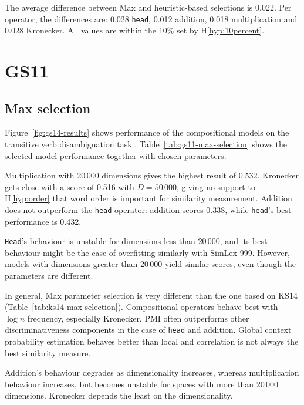 The average difference between Max and heuristic-based selections is 0.022. Per operator, the differences are: 0.028 \texttt{head}, 0.012 addition, 0.018 multiplication and 0.028 Kronecker. All values are within the 10\% set by H\ref{hyp:10percent}.

\section{GS11}
\label{sec:gs11}

\subsection{Max selection}
\label{sec:max-selection-gs11}



Figure~\ref{fig:gs14-results} shows performance of the compositional models on the transitive verb disambiguation task \cite{Grefenstette:2011:ESC:2145432.2145580}. Table~\ref{tab:gs11-max-selection} shows the selected model performance together with chosen parameters.

Multiplication with 20\,000 dimensions gives the highest result of 0.532. Kronecker gets close with a score of 0.516 with $D = 50\,000$, giving no support to H\ref{hyp:order} that word order is important for similarity measurement. Addition does not outperform the \texttt{head} operator: addition scores 0.338, while \texttt{head}'s best performance is 0.432.

\texttt{Head}'s behaviour is unstable for dimensions less than 20\,000, and its best behaviour might be the case of overfitting similarly with SimLex-999. However, models with dimensions greater than 20\,000 yield similar scores, even though the parameters are different.

In general, Max parameter selection is very different than the one based on KS14 (Table~\ref{tab:ks14-max-selection}). Compositional operators behave best with $\log n$ frequency, especially Kronecker. PMI often outperforms other discriminativeness components in the case of \texttt{head} and addition. Global context probability estimation behaves better than local and correlation is not always the best similarity measure.

Addition's behaviour degrades as dimensionality increases, whereas multiplication behaviour increases, but becomes unstable for spaces with more than 20\,000 dimensions. Kronecker depends the least on the dimensionality.

